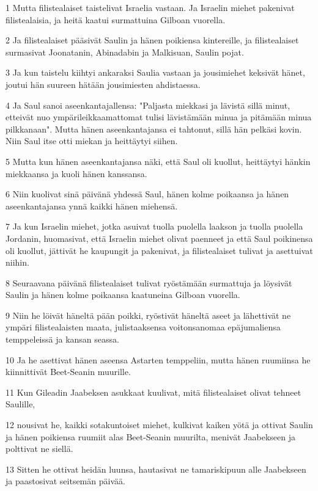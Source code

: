 \par 1 Mutta filistealaiset taistelivat Israelia vastaan. Ja Israelin miehet pakenivat filistealaisia, ja heitä kaatui surmattuina Gilboan vuorella.
\par 2 Ja filistealaiset pääsivät Saulin ja hänen poikiensa kintereille, ja filistealaiset surmasivat Joonatanin, Abinadabin ja Malkisuan, Saulin pojat.
\par 3 Ja kun taistelu kiihtyi ankaraksi Saulia vastaan ja jousimiehet keksivät hänet, joutui hän suureen hätään jousimiesten ahdistaessa.
\par 4 Ja Saul sanoi aseenkantajallensa: "Paljasta miekkasi ja lävistä sillä minut, etteivät nuo ympärileikkaamattomat tulisi lävistämään minua ja pitämään minua pilkkanaan". Mutta hänen aseenkantajansa ei tahtonut, sillä hän pelkäsi kovin. Niin Saul itse otti miekan ja heittäytyi siihen.
\par 5 Mutta kun hänen aseenkantajansa näki, että Saul oli kuollut, heittäytyi hänkin miekkaansa ja kuoli hänen kanssansa.
\par 6 Niin kuolivat sinä päivänä yhdessä Saul, hänen kolme poikaansa ja hänen aseenkantajansa ynnä kaikki hänen miehensä.
\par 7 Ja kun Israelin miehet, jotka asuivat tuolla puolella laakson ja tuolla puolella Jordanin, huomasivat, että Israelin miehet olivat paenneet ja että Saul poikinensa oli kuollut, jättivät he kaupungit ja pakenivat, ja filistealaiset tulivat ja asettuivat niihin.
\par 8 Seuraavana päivänä filistealaiset tulivat ryöstämään surmattuja ja löysivät Saulin ja hänen kolme poikaansa kaatuneina Gilboan vuorella.
\par 9 Niin he löivät häneltä pään poikki, ryöstivät häneltä aseet ja lähettivät ne ympäri filistealaisten maata, julistaaksensa voitonsanomaa epäjumaliensa temppeleissä ja kansan seassa.
\par 10 Ja he asettivat hänen aseensa Astarten temppeliin, mutta hänen ruumiinsa he kiinnittivät Beet-Seanin muurille.
\par 11 Kun Gileadin Jaabeksen asukkaat kuulivat, mitä filistealaiset olivat tehneet Saulille,
\par 12 nousivat he, kaikki sotakuntoiset miehet, kulkivat kaiken yötä ja ottivat Saulin ja hänen poikiensa ruumiit alas Beet-Seanin muurilta, menivät Jaabekseen ja polttivat ne siellä.
\par 13 Sitten he ottivat heidän luunsa, hautasivat ne tamariskipuun alle Jaabekseen ja paastosivat seitsemän päivää.


